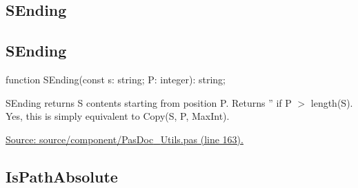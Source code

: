 \documentclass{report}
\newif\ifpdf
\begin{document}
\subsection*{\large{\textbf{SEnding}}\normalsize\hspace{1ex}\hrulefill}
\else
\subsection*{SEnding}
\fi
\label{PasDoc_Utils-SEnding}
\begin{list}{}{
\setlength{\itemindent}{0cm}
\setlength{\listparindent}{0cm}
\setlength{\leftmargin}{\evensidemargin}
\addtolength{\leftmargin}{\tmplength}
\settowidth{\labelsep}{X}
\addtolength{\leftmargin}{\labelsep}
\setlength{\labelwidth}{\tmplength}
}
\item[\textbf{Declaration}\hfill]
\ifpdf
\begin{flushleft}
\fi
\begin{ttfamily}
function SEnding(const s: string; P: integer): string;\end{ttfamily}

\ifpdf
\end{flushleft}
\fi

\par
\item[\textbf{Description}]
SEnding returns S contents starting from position P. Returns '' if P {$>$} length(S). Yes, this is simply equivalent to Copy(S, P, MaxInt).\par
\href{https://github.com/pasdoc/pasdoc/blob/master/source/component/PasDoc_Utils.pas#L163}{Source: source/component/PasDoc{\_}Utils.pas (line 163).}

\end{list}
\ifpdf
\subsection*{\large{\textbf{IsPathAbsolute}}\normalsize\hspace{1ex}\hrulefill}
\else
\end{document}
